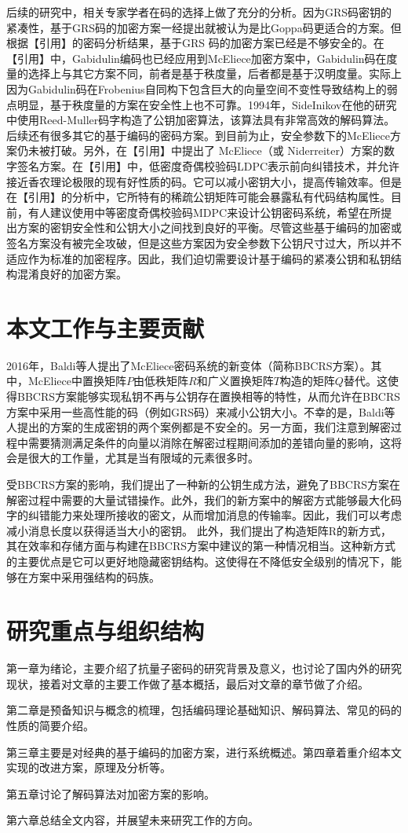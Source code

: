 后续的研究中，相关专家学者在码的选择上做了充分的分析。因为GRS码密钥的紧凑性，基于GRS码的加密方案一经提出就被认为是比Goppa码更适合的方案。但根据【引用】的密码分析结果，基于GRS 码的加密方案已经是不够安全的。在【引用】中，Gabidulin编码也已经应用到McEliece加密方案中，Gabidulin码在度量的选择上与其它方案不同，前者是基于秩度量，后者都是基于汉明度量。实际上因为Gabidulin码在Frobenius自同构下包含巨大的向量空间不变性导致结构上的弱点明显，基于秩度量的方案在安全性上也不可靠。1994年，SideInikov在他的研究中使用Reed-Muller码字构造了公钥加密算法，该算法具有非常高效的解码算法。后续还有很多其它的基于编码的密码方案。到目前为止，安全参数下的McEliece方案仍未被打破。另外，在【引用】中提出了 McEliece（或 Niderreiter）方案的数字签名方案。在【引用】中，低密度奇偶校验码LDPC表示前向纠错技术，并允许接近香农理论极限的现有好性质的码。它可以减小密钥大小，提高传输效率。但是在【引用】的分析中，它所特有的稀疏公钥矩阵可能会暴露私有代码结构属性。目前，有人建议使用中等密度奇偶校验码MDPC来设计公钥密码系统，希望在所提出方案的密钥安全性和公钥大小之间找到良好的平衡。尽管这些基于编码的加密或签名方案没有被完全攻破，但是这些方案因为安全参数下公钥尺寸过大，所以并不适应作为标准的加密程序。因此，我们迫切需要设计基于编码的紧凑公钥和私钥结构混淆良好的加密方案。

\section{本文工作与主要贡献}
2016年，Baldi等人提出了McEliece密码系统的新变体（简称BBCRS方案）。其中，McEliece中置换矩阵$P$由低秩矩阵$R$和广义置换矩阵$T$构造的矩阵$Q$替代。这使得BBCRS方案能够实现私钥不再与公钥存在置换相等的特性，从而允许在BBCRS方案中采用一些高性能的码（例如GRS码）来减小公钥大小。不幸的是，Baldi等人提出的方案的生成密钥的两个案例都是不安全的。另一方面，我们注意到解密过程中需要猜测满足条件的向量以消除在解密过程期间添加的差错向量的影响，这将会是很大的工作量，尤其是当有限域的元素很多时。

受BBCRS方案的影响，我们提出了一种新的公钥生成方法，避免了BBCRS方案在解密过程中需要的大量试错操作。此外，我们的新方案中的解密方式能够最大化码字的纠错能力来处理所接收的密文，从而增加消息的传输率。因此，我们可以考虑减小消息长度以获得适当大小的密钥。 此外，我们提出了构造矩阵R的新方式，其在效率和存储方面与构建在BBCRS方案中建议的第一种情况相当。这种新方式的主要优点是它可以更好地隐藏密钥结构。这使得在不降低安全级别的情况下，能够在方案中采用强结构的码族。

\section{研究重点与组织结构}
第一章为绪论，主要介绍了抗量子密码的研究背景及意义，也讨论了国内外的研究现状，接着对文章的主要工作做了基本概括，最后对文章的章节做了介绍。

第二章是预备知识与概念的梳理，包括编码理论基础知识、解码算法、常见的码的性质的简要介绍。

第三章主要是对经典的基于编码的加密方案，进行系统概述。第四章着重介绍本文实现的改进方案，原理及分析等。

第五章讨论了解码算法对加密方案的影响。

第六章总结全文内容，并展望未来研究工作的方向。




